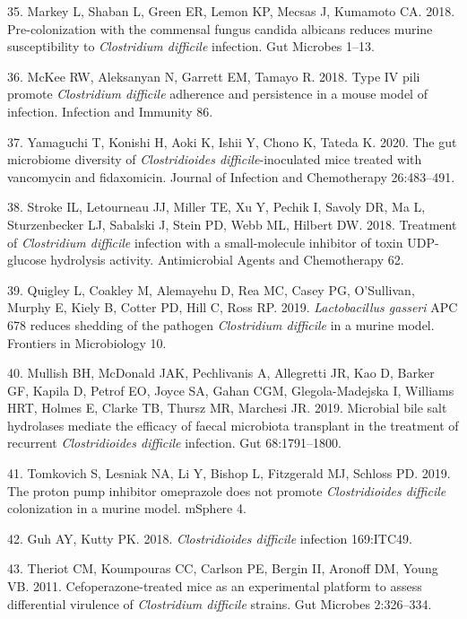 \documentclass[11pt,]{article}
\begin{document}
\hypertarget{ref-Markey2018}{}
35. Markey L, Shaban L, Green ER, Lemon KP, Mecsas J, Kumamoto CA. 2018.
Pre-colonization with the commensal fungus candida albicans reduces
murine susceptibility to \emph{Clostridium difficile} infection. Gut
Microbes 1--13.

\hypertarget{ref-McKee2018}{}
36. McKee RW, Aleksanyan N, Garrett EM, Tamayo R. 2018. Type IV pili
promote \emph{Clostridium difficile} adherence and persistence in a
mouse model of infection. Infection and Immunity 86.

\hypertarget{ref-Yamaguchi2020}{}
37. Yamaguchi T, Konishi H, Aoki K, Ishii Y, Chono K, Tateda K. 2020.
The gut microbiome diversity of \emph{Clostridioides
difficile}-inoculated mice treated with vancomycin and fidaxomicin.
Journal of Infection and Chemotherapy 26:483--491.

\hypertarget{ref-Stroke2018}{}
38. Stroke IL, Letourneau JJ, Miller TE, Xu Y, Pechik I, Savoly DR, Ma
L, Sturzenbecker LJ, Sabalski J, Stein PD, Webb ML, Hilbert DW. 2018.
Treatment of \emph{Clostridium difficile} infection with a
small-molecule inhibitor of toxin UDP-glucose hydrolysis activity.
Antimicrobial Agents and Chemotherapy 62.

\hypertarget{ref-Quigley2019}{}
39. Quigley L, Coakley M, Alemayehu D, Rea MC, Casey PG, O'Sullivan,
Murphy E, Kiely B, Cotter PD, Hill C, Ross RP. 2019. \emph{Lactobacillus
gasseri} APC 678 reduces shedding of the pathogen \emph{Clostridium
difficile} in a murine model. Frontiers in Microbiology 10.

\hypertarget{ref-Mullish2019}{}
40. Mullish BH, McDonald JAK, Pechlivanis A, Allegretti JR, Kao D,
Barker GF, Kapila D, Petrof EO, Joyce SA, Gahan CGM, Glegola-Madejska I,
Williams HRT, Holmes E, Clarke TB, Thursz MR, Marchesi JR. 2019.
Microbial bile salt hydrolases mediate the efficacy of faecal microbiota
transplant in the treatment of recurrent \emph{Clostridioides difficile}
infection. Gut 68:1791--1800.

\hypertarget{ref-Tomkovich2019}{}
41. Tomkovich S, Lesniak NA, Li Y, Bishop L, Fitzgerald MJ, Schloss PD.
2019. The proton pump inhibitor omeprazole does not promote
\emph{Clostridioides difficile} colonization in a murine model. mSphere
4.

\hypertarget{ref-Guh2018}{}
42. Guh AY, Kutty PK. 2018. \emph{Clostridioides difficile} infection
169:ITC49.

\hypertarget{ref-Theriot2011}{}
43. Theriot CM, Koumpouras CC, Carlson PE, Bergin II, Aronoff DM, Young
VB. 2011. Cefoperazone-treated mice as an experimental platform to
assess differential virulence of \emph{Clostridium difficile} strains.
Gut Microbes 2:326--334.
\end{document}
